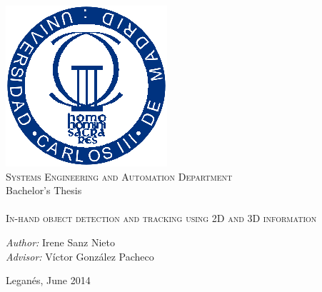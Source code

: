 \begin{titlepage}
	\begin{center}

		 \includegraphics[size=0.8]{img/uc3m.eps}  \\[0.5 cm]

		\large \textsc{Systems Engineering and Automation Department} \\ [1 cm]

		\large Bachelor's Thesis\\[1 cm]
		\Huge {} \\[1 cm]
		\huge \textsc{In-hand object detection and tracking using 2D and 3D information}\\[8 cm]


		\begin{flushright} \Large
			\emph{Author:} Irene Sanz Nieto\\[0.5 cm]
			\emph{Advisor:} Víctor González Pacheco \\
		\end{flushright}

		\vfill

		{\large Leganés, June 2014}

	\end{center}
\end{titlepage}
